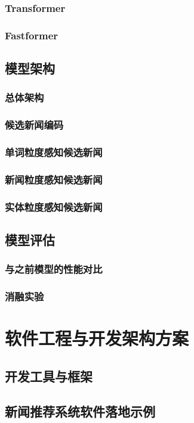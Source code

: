 \documentclass[withoutpreface,bwprint]{cumcmthesis} %
\begin{document}
	\subsubsection{ Transformer}
	\subsubsection{ Fastformer}
	\subsection{模型架构}
	\subsubsection{ 总体架构}
	\subsubsection{ 候选新闻编码}
	\subsubsection{ 单词粒度感知候选新闻}
	\subsubsection{ 新闻粒度感知候选新闻}
	\subsubsection{ 实体粒度感知候选新闻}
	\subsection{模型评估}
	\subsubsection{ 与之前模型的性能对比}
	\subsubsection{ 消融实验}
	\newpage
	\section{软件工程与开发架构方案}
	\subsection{开发工具与框架}
	\subsection{新闻推荐系统软件落地示例}
\end{document}
